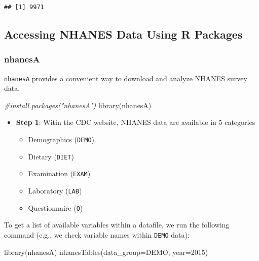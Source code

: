 \documentclass[
]{book}
\newenvironment{Shaded}{\begin{snugshade}}{\end{snugshade}}
\newcommand{\AttributeTok}[1]{\textcolor[rgb]{0.77,0.63,0.00}{#1}}
\newcommand{\CommentTok}[1]{\textcolor[rgb]{0.56,0.35,0.01}{\textit{#1}}}
\newcommand{\DecValTok}[1]{\textcolor[rgb]{0.00,0.00,0.81}{#1}}
\newcommand{\FunctionTok}[1]{\textcolor[rgb]{0.00,0.00,0.00}{#1}}
\newcommand{\NormalTok}[1]{#1}
\newcommand{\StringTok}[1]{\textcolor[rgb]{0.31,0.60,0.02}{#1}}
\providecommand{\tightlist}{%
  \setlength{\itemsep}{0pt}\setlength{\parskip}{0pt}}
\begin{document}
\begin{verbatim}
## [1] 9971
\end{verbatim}

\hypertarget{accessing-nhanes-data-using-r-packages}{%
\subsection{Accessing NHANES Data Using R Packages}\label{accessing-nhanes-data-using-r-packages}}

\hypertarget{nhanesa}{%
\subsubsection{nhanesA}\label{nhanesa}}

\texttt{nhanesA} provides a convenient way to download and analyze NHANES survey data.

\begin{Shaded}
\begin{Highlighting}[]
\CommentTok{\#install.packages("nhanesA")}
\FunctionTok{library}\NormalTok{(nhanesA)}
\end{Highlighting}
\end{Shaded}

\begin{itemize}
\tightlist
\item
  \textbf{Step 1}: Witin the CDC website, NHANES data are available in 5 categories

  \begin{itemize}
  \tightlist
  \item
    Demographics (\texttt{DEMO})
  \item
    Dietary (\texttt{DIET})
  \item
    Examination (\texttt{EXAM})
  \item
    Laboratory (\texttt{LAB})
  \item
    Questionnaire (\texttt{Q})
  \end{itemize}
\end{itemize}

To get a list of available variables within a datafile, we run the following command (e.g., we check variable names within \texttt{DEMO} data):

\begin{Shaded}
\begin{Highlighting}[]
\FunctionTok{library}\NormalTok{(nhanesA)}
\FunctionTok{nhanesTables}\NormalTok{(}\AttributeTok{data\_group=}\StringTok{\textquotesingle{}DEMO\textquotesingle{}}\NormalTok{, }\AttributeTok{year=}\DecValTok{2015}\NormalTok{)}
\end{Highlighting}
\end{Shaded}
\end{document}
